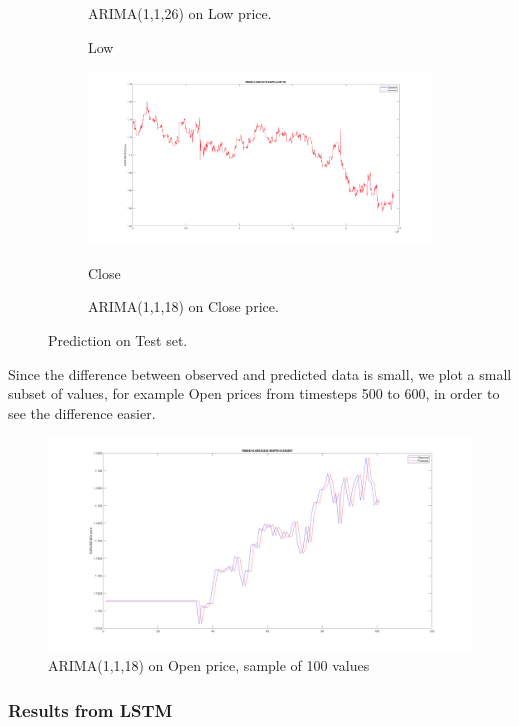 \documentclass[11pt]{article}
\begin{document}
\begin{figure}[H]
\begin{subfigure}[b]{0.5\textwidth}
    \caption{ARIMA(1,1,26) on Low price.}
    \caption{Low}
  \end{subfigure}
  \quad\quad\quad\quad\quad\quad\quad
  \begin{subfigure}[b]{0.5\textwidth}
    \includegraphics[width=\linewidth,keepaspectratio]{figs/arima_1_1_18_close.png}
    \caption{Close}
    \caption{ARIMA(1,1,18) on Close price.}
  \end{subfigure}
  \caption{Prediction on Test set.}
\end{figure}
Since the difference between observed and predicted data is small, we plot a
small subset of values, for example Open prices from timesteps 500 to 600, in
order to see the difference easier.

\begin{figure}[H]
  \centering
  \includegraphics[width=\textwidth,keepaspectratio]{figs/arima_open_sample.png}
  \caption{ARIMA(1,1,18) on Open price, sample of 100 values}
\end{figure}


\subsubsection{Results from LSTM}
\end{document}
